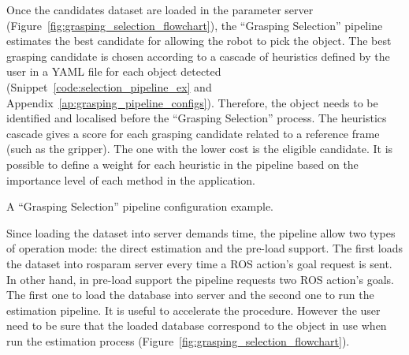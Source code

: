 Once the candidates dataset are loaded in the parameter server (Figure~\ref{fig:grasping_selection_flowchart}), the ``Grasping Selection'' pipeline estimates the best candidate for allowing the robot to pick the object. The best grasping candidate is chosen according to a cascade of heuristics defined by the user in a YAML file for each object detected (Snippet~\ref{code:selection_pipeline_ex} and Appendix~\ref{ap:grasping_pipeline_configs}). Therefore, the object needs to be identified and localised before the ``Grasping Selection'' process. The heuristics cascade gives a score for each grasping candidate related to a reference frame (such as the gripper). The one with the lower cost is the eligible candidate. It is possible to define a weight for each heuristic in the pipeline based on the importance level of each method in the application.

\begin{snippet}[h!]
\centering
{}
\caption{A ``Grasping Selection'' pipeline configuration example.}
\label{code:selection_pipeline_ex}
\end{snippet}

Since loading the dataset into server demands time, the pipeline allow two types of operation mode: the direct estimation and the pre-load support. The first loads the dataset into rosparam server every time a ROS action's goal request is sent. In other hand, in pre-load support the pipeline requests two ROS action's goals. The first one to load the database into server and the second one to run the estimation pipeline. It is useful to accelerate the procedure. However the user need to be sure that the loaded database correspond to the object in use when run the estimation process (Figure~\ref{fig:grasping_selection_flowchart}).

